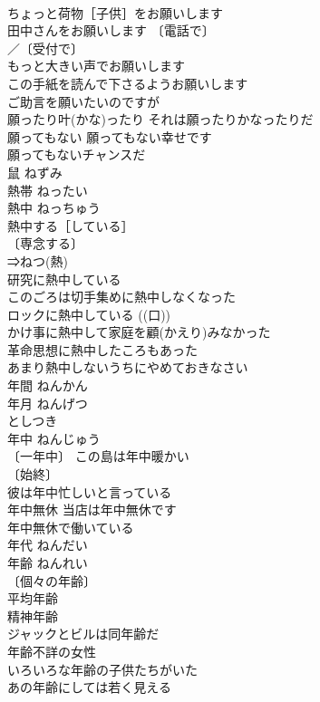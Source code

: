 \documentclass[8pt]{extreport}
\begin{document}
\begin{CJK}{UTF8}{min}
\\	ちょっと荷物［子供］をお願いします 
\\	田中さんをお願いします 〔電話で〕
\\	／〔受付で〕
\\	もっと大きい声でお願いします 
\\	この手紙を読んで下さるようお願いします 
\\	ご助言を願いたいのですが 
\\	願ったり叶(かな)ったり それは願ったりかなったりだ 
\\	願ってもない 願ってもない幸せです 
\\	願ってもないチャンスだ 
\\	鼠	ねずみ	
\\	熱帯	ねったい	
\\	熱中	ねっちゅう	
\\	熱中する［している］ 
\\	〔専念する〕
\\	⇒ねつ(熱)
\\	研究に熱中している 
\\	このごろは切手集めに熱中しなくなった 
\\	ロックに熱中している ((口)) 
\\	かけ事に熱中して家庭を顧(かえり)みなかった 
\\	革命思想に熱中したころもあった 
\\	あまり熱中しないうちにやめておきなさい 
\\	年間	ねんかん	
\\	年月	ねんげつ 
\\	としつき	
\\	年中	ねんじゅう	
\\	〔一年中〕 この島は年中暖かい 
\\	〔始終〕
\\	彼は年中忙しいと言っている 
\\	年中無休 当店は年中無休です 
\\	年中無休で働いている 
\\	年代	ねんだい	
\\	年齢	ねんれい	
\\	〔個々の年齢〕
\\	平均年齢 
\\	精神年齢 
\\	ジャックとビルは同年齢だ 
\\	年齢不詳の女性 
\\	いろいろな年齢の子供たちがいた 
\\	あの年齢にしては若く見える 

\end{CJK}
\end{document}
